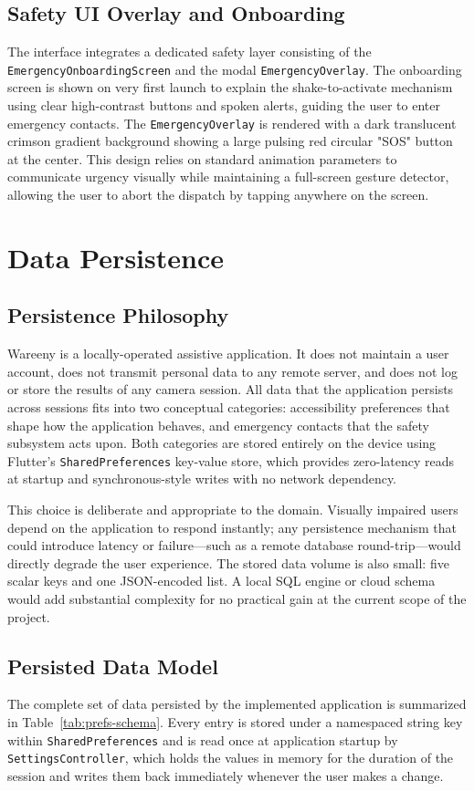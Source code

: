 \documentclass[a4paper]{report}
\begin{document}
\subsection{Safety UI Overlay and Onboarding}
The interface integrates a dedicated safety layer consisting of the \texttt{EmergencyOnboardingScreen} and the modal \texttt{EmergencyOverlay}. The onboarding screen is shown on very first launch to explain the shake-to-activate mechanism using clear high-contrast buttons and spoken alerts, guiding the user to enter emergency contacts. The \texttt{EmergencyOverlay} is rendered with a dark translucent crimson gradient background showing a large pulsing red circular "SOS" button at the center. This design relies on standard animation parameters to communicate urgency visually while maintaining a full-screen gesture detector, allowing the user to abort the dispatch by tapping anywhere on the screen.

\section{Data Persistence}
\subsection{Persistence Philosophy}
Wareeny is a locally-operated assistive application. It does not maintain a user account, does not transmit personal data to any remote server, and does not log or store the results of any camera session. All data that the application persists across sessions fits into two conceptual categories: accessibility preferences that shape how the application behaves, and emergency contacts that the safety subsystem acts upon. Both categories are stored entirely on the device using Flutter's \texttt{SharedPreferences} key-value store, which provides zero-latency reads at startup and synchronous-style writes with no network dependency.

This choice is deliberate and appropriate to the domain. Visually impaired users depend on the application to respond instantly; any persistence mechanism that could introduce latency or failure---such as a remote database round-trip---would directly degrade the user experience. The stored data volume is also small: five scalar keys and one JSON-encoded list. A local SQL engine or cloud schema would add substantial complexity for no practical gain at the current scope of the project.

\subsection{Persisted Data Model}
The complete set of data persisted by the implemented application is summarized in Table~\ref{tab:prefs-schema}. Every entry is stored under a namespaced string key within \texttt{SharedPreferences} and is read once at application startup by \texttt{SettingsController}, which holds the values in memory for the duration of the session and writes them back immediately whenever the user makes a change.
\end{document}
